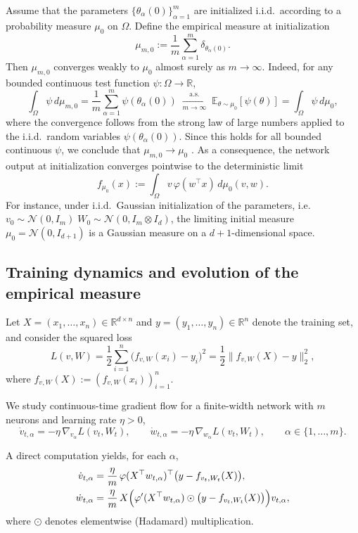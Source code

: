 Assume that the parameters $\{\theta_\alpha(0)\}_{\alpha=1}^m$ are initialized
i.i.d.\ according to a probability measure $\mu_0$ on $\Omega$.
Define the empirical measure at initialization
\[
	\mu_{m,0}
	:=
	\frac1m\sum_{\alpha=1}^m \delta_{\theta_\alpha(0)} .
\]
Then $\mu_{m,0}$ converges weakly to $\mu_0$ almost surely as $m\to\infty$.
Indeed, for any bounded continuous test function $\psi:\Omega\to\mathbb R$,
\[
	\int_\Omega \psi\,d\mu_{m,0}
	=
	\frac1m\sum_{\alpha=1}^m \psi(\theta_\alpha(0))
	\;\xrightarrow[m \to \infty]{\text{a.s.}}\;
	\mathbb E_{\theta\sim\mu_0}[\psi(\theta)]
	=
	\int_\Omega \psi\,d\mu_0,
\]
where the convergence follows from the strong law of large numbers applied to
the i.i.d.\ random variables $\psi(\theta_\alpha(0))$.
Since this holds for all bounded continuous $\psi$, we conclude that
$\mu_{m,0} \to \mu_0$ \citep{vadaranjan1958convergenceofprobabilitydistribution}.
As a consequence, the network output at initialization converges pointwise to
the deterministic limit
\[
	f_{\mu_0}(x)
	:=
	\int_\Omega v\,\varphi(w^\top x)\,d\mu_0(v,w).
\]
For instance, under i.i.d.\ Gaussian initialization of the parameters, i.e.
$v_0 \sim \mathcal{N}(0,I_m)\; W_0 \sim \mathcal{N}(0, I_m \otimes I_d)$, the
limiting initial measure $\mu_0 = \mathcal{N}(0, I_{d+1})$ is a Gaussian
measure on a $d+1$-dimensional space.

\subsection{Training dynamics and evolution of the empirical measure}\label{app:mf-particle-dynamics}

Let $X=(x_1,\dots,x_n)\in\mathbb R^{d\times n}$ and
$y=(y_1,\ldots,y_n)\in\mathbb R^n$ denote the training set, and consider the
squared loss
\[
	L(v,W)
	=
	\frac12\sum_{i=1}^n\bigl(f_{v,W}(x_i)-y_i\bigr)^2
	=
	\frac12\|f_{v,W}(X)-y\|_2^2,
\]
where $f_{v,W}(X):=(f_{v,W}(x_i))_{i=1}^n$.

We study continuous-time gradient flow for a finite-width network with $m$
neurons and learning rate $\eta>0$,
\[
	\dot v_{t,\alpha}
	=
	-\eta\,\nabla_{v_\alpha}L(v_t,W_t),
	\qquad
	\dot w_{t,\alpha}
	=
	-\eta\,\nabla_{w_\alpha}L(v_t,W_t),
	\qquad
	\alpha\in\{1,\dots,m\}.
\]

A direct computation yields, for each $\alpha$,
\begin{align}
	\dot v_{t, \alpha}
	 & =
	\frac{\eta}{m}\,
	\varphi(X^\top w_{t,\alpha})^\top
	\bigl(y-f_{v_t,W_t}(X)\bigr),
	\label{eq:mf-ode-v-app} \\
	\dot w_{t,\alpha}
	 & =
	\frac{\eta}{m}\,
	X\Bigl(
	\varphi'(X^\top w_{t,\alpha})
	\odot
	\bigl(y-f_{v_t,W_t}(X)\bigr)
	\Bigr)v_{t,\alpha},
	\label{eq:mf-ode-w-app}
\end{align}
where $\odot$ denotes elementwise (Hadamard) multiplication.


